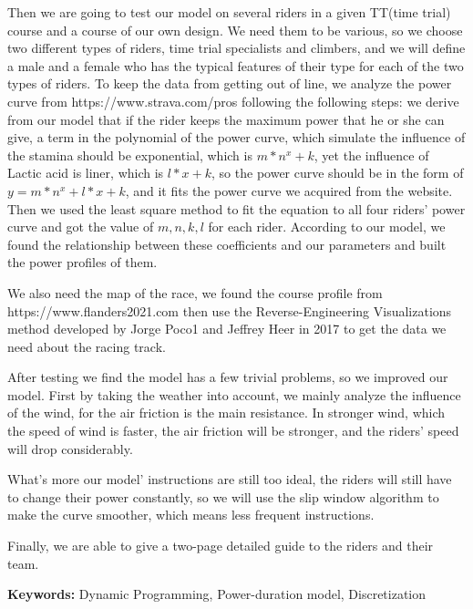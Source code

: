 \documentclass[12pt]{article}
\begin{document}
Then we are going to test our model on several riders in a given TT(time trial) course and a course of our own design. We need them to be various, so we choose two different types of riders, time trial
specialists and climbers, and we will define a male and a female who has the typical features of their type for each of the two types of riders.
To keep the data from getting out of line, we analyze the power curve
from https://www.strava.com/pros following the following steps:
we derive from our model that if the rider keeps the maximum power that he or she can give, a term in the polynomial of the power curve,  which simulate the influence of the stamina should be exponential,
which is $m*n^x+k$, yet the influence of Lactic acid is liner, which is $l*x+k$, so the power curve should be in the form of $y=m*n^x+l*x+k$,
and it fits the power curve we acquired from the website.
Then we used the least square method to fit the equation to all four riders' power curve and  %
got the value of $m,n,k,l$ for each rider. According to our model, we found the relationship between these
coefficients and our parameters and built the power profiles of them.

We also need the map of the race, we found the course profile from https://www.flanders2021.com
then use the Reverse-Engineering Visualizations method developed by Jorge Poco1 and Jeffrey Heer in 2017\cite{poco2017reverse} to get the data we need about the racing track.

After testing we find the model has a few trivial problems, so we improved our model.
First by taking the weather into account, we mainly analyze the influence of the
wind, for the air friction is the main resistance. In stronger wind, which the speed of wind is faster, the air friction will be stronger,
and the riders' speed will drop considerably.

What's more our model' instructions are still too ideal, the riders will still have to change their power constantly, so we will use the slip window algorithm to make the curve
smoother, which means less frequent instructions.

Finally, we are able to  give a two-page detailed guide to the riders and their team.

\begin{flushleft}
    \textbf{Keywords:} Dynamic Programming, Power-duration model, Discretization
\end{flushleft}


\end{document}
